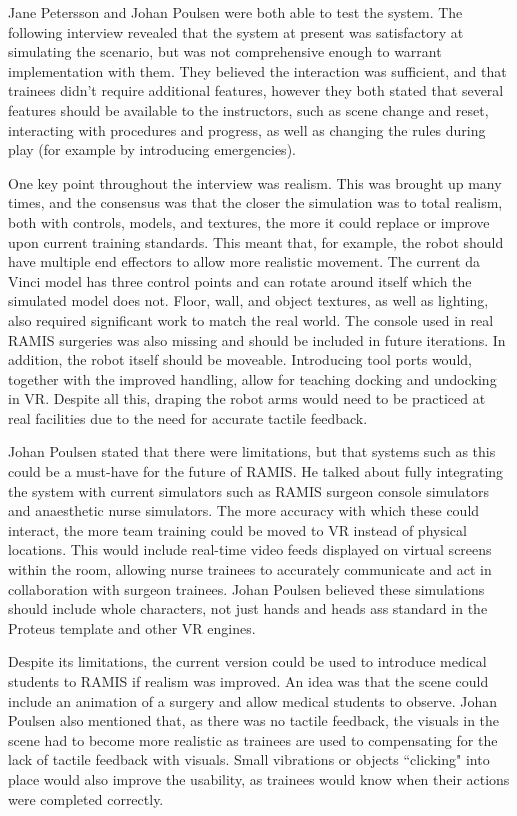 Jane Petersson and Johan Poulsen were both able to test the system. The following interview revealed that the system at present was satisfactory at simulating the scenario, but was not comprehensive enough to warrant implementation with them. They believed the interaction was sufficient, and that trainees didn't require additional features, however they both stated that several features should be available to the instructors, such as scene change and reset, interacting with procedures and progress, as well as changing the rules during play (for example by introducing emergencies).

One key point throughout the interview was realism. This was brought up many times, and the consensus was that the closer the simulation was to total realism, both with controls, models, and textures, the more it could replace or improve upon current training standards. This meant that, for example, the robot should have multiple end effectors to allow more realistic movement. The current da Vinci model has three control points and can rotate around itself which the simulated model does not. Floor, wall, and object textures, as well as lighting, also required significant work to match the real world. The console used in real RAMIS surgeries was also missing and should be included in future iterations. In addition, the robot itself should be moveable. Introducing tool ports would, together with the improved handling, allow for teaching docking and undocking in VR. Despite all this, draping the robot arms would need to be practiced at real facilities due to the need for accurate tactile feedback.

Johan Poulsen stated that there were limitations, but that systems such as this could be a must-have for the future of RAMIS. He talked about fully integrating the system with current simulators such as RAMIS surgeon console simulators and anaesthetic nurse simulators. The more accuracy with which these could interact, the more team training could be moved to VR instead of physical locations. This would include real-time video feeds displayed on virtual screens within the room, allowing nurse trainees to accurately communicate and act in collaboration with surgeon trainees. Johan Poulsen believed these simulations should include whole characters, not just hands and heads ass standard in the Proteus template and other VR engines.

Despite its limitations, the current version could be used to introduce medical students to RAMIS if realism was improved. An idea was that the scene could include an animation of a surgery and allow medical students to observe. Johan Poulsen also mentioned that, as there was no tactile feedback, the visuals in the scene had to become more realistic as trainees are used to compensating for the lack of tactile feedback with visuals. Small vibrations or objects ``clicking" into place would also improve the usability, as trainees would know when their actions were completed correctly.

